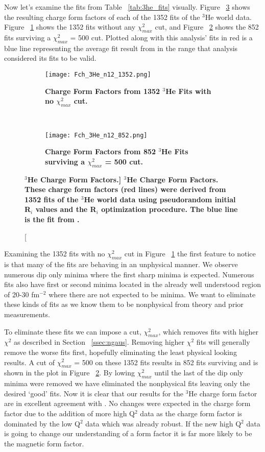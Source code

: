 Now let's examine the fits from Table ~\ref{tab:3he_fits} visually. Figure ~\ref{fig:3he_fch} shows the resulting charge form factors of each of the 1352 fits of the $^3$He world data. Figure ~\ref{fig:3he_fch_no_cut} shows the 1352 fits without any $\chi^2_{max}$ cut, and Figure ~\ref{fig:3he_fch_cut} shows the 852 fits surviving a $\chi^2_{max}$ = 500 cut. Plotted along with this analysis' fits in red is a blue line representing the average fit result from \cite{Article:Amroun} in the range that analysis considered its fits to be valid. 

\begin{figure}[!ht]
\begin{subfigure}{1.\textwidth}
  \centering
  \texttt{[image: Fch\_3He\_n12\_1352.png]}
  \caption{\bf{Charge Form Factors from 1352 $^3$He Fits with no $\chi^2_{max}$ cut.}}
  \label{fig:3he_fch_no_cut}
\end{subfigure}\\
\begin{subfigure}{1.\textwidth}
  \centering
  \texttt{[image: Fch\_3He\_n12\_852.png]}
  \caption{\bf{Charge Form Factors from 852 $^3$He Fits surviving a $\chi^2_{max}$ = 500 cut.}}
  \label{fig:3he_fch_cut}
\end{subfigure}
\caption[\bf{$^3$He Charge Form Factors.}] {
{\bf{$^3$He Charge Form Factors.}} These charge form factors (red lines) were derived from 1352 fits of the $^3$He world data using pseudorandom initial R$_i$ values and the R$_i$ optimization procedure. The blue line is the fit from \cite{Article:Amroun}.}
\label{fig:3he_fch}
\end{figure}

Examining the 1352 fits with no $\chi^2_{max}$ cut in Figure ~\ref{fig:3he_fch_no_cut} the first feature to notice is that many of the fits are behaving in an unphysical manner. We observe numerous dip only minima where the first sharp minima is expected. Numerous fits also have first or second minima located in the already well understood region of 20-30 fm$^{-2}$ where there are not expected to be minima. We want to eliminate these kinds of fits as we know them to be nonphysical from theory and prior measurements. 

To eliminate these fits we can impose a cut, $\chi^2_{max}$, which removes fits with higher $\chi^2$ as described in Section ~\ref{ssec:ngaus}. Removing higher $\chi^2$ fits will generally remove the worse fits first, hopefully eliminating the least physical looking results. A cut of $\chi^2_{max}$ = 500 on these 1352 fits results in 852 fits surviving and is shown in the plot in Figure ~\ref{fig:3he_fch_cut}. By lowing $\chi^2_{max}$ until the last of the dip only minima were removed we have eliminated the nonphysical fits leaving only the desired `good' fits. Now it is clear that our results for the $^3$He charge form factor are in excellent agreement with \cite{Article:Amroun}. No changes were expected in the charge form factor due to the addition of more high Q$^2$ data as the charge form factor is dominated by the low Q$^2$ data which was already robust. If the new high Q$^2$ data is going to change our understanding of a form factor it is far more likely to be the magnetic form factor.

